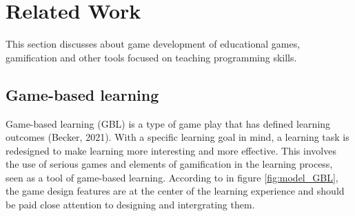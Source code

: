 \section{Related Work}
This section discusses about game development of educational games, gamification and other tools focused on teaching programming skills.






\subsection{Game-based learning}
Game-based learning (GBL) is a type of game play that has defined learning outcomes (Becker, 2021). With a specific learning goal in mind, a learning task is redesigned to make learning more interesting and more effective. This involves the use of serious games and elements of gamification in the learning process, seen as a tool of game-based learning. According to \cite{plass2015foundations} in figure \ref{fig:model_GBL}, the game design features are at the center of the learning experience and should be paid close attention to designing and intergrating them. 

